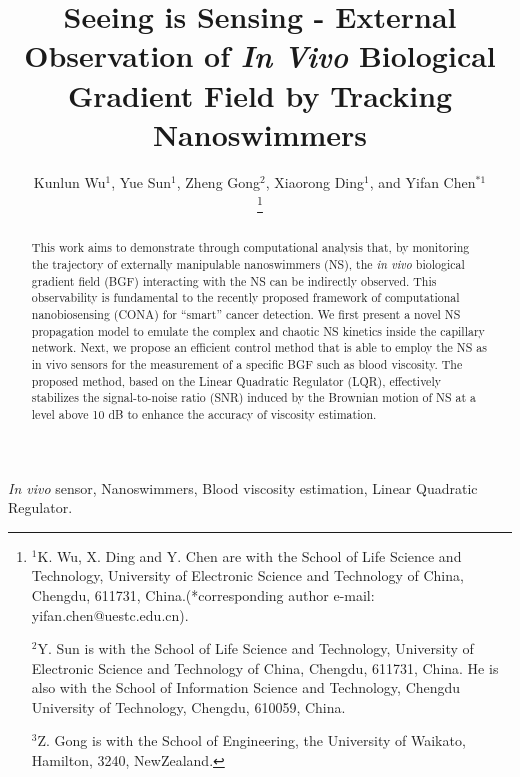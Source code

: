 \documentclass[conference]{IEEEtran}
\begin{document}

\title{Seeing is Sensing - External Observation of \emph{In Vivo} Biological Gradient Field by Tracking Nanoswimmers  }


\author{Kunlun Wu$^{1}$, %
	  Yue Sun$^{1}$,
	  Zheng Gong$^{2}$,
	  Xiaorong Ding$^{1}$, and
	  Yifan Chen$^{*1}$

\thanks{$^{1}$K. Wu, X. Ding and Y. Chen are with the School of Life Science and Technology, University of Electronic Science and Technology of China, Chengdu, 611731, China.(*corresponding author e-mail: yifan.chen@uestc.edu.cn).

	  $^{2}$Y. Sun is with the School of Life Science and Technology, University of Electronic Science and Technology of China, Chengdu, 611731, China. He is also with the School of Information Science and Technology, Chengdu University of Technology, Chengdu, 610059, China.

	  $^{3}$Z. Gong is with the School of  Engineering, the University of Waikato, Hamilton, 3240, NewZealand.
      }%

}



\maketitle

\begin{abstract}
This work aims to demonstrate through computational analysis that, by monitoring the trajectory of externally manipulable nanoswimmers (NS), the \emph{in vivo} biological gradient field (BGF) interacting with the NS can be indirectly observed. This observability is fundamental to the recently proposed framework of computational nanobiosensing (CONA) for “smart” cancer detection. We first present a novel NS propagation model to emulate the complex and chaotic NS kinetics inside the capillary network. Next, we propose an efficient control method that is able to employ the NS as in vivo sensors for the measurement of a specific BGF such as blood viscosity. The proposed method, based on the Linear Quadratic Regulator (LQR), effectively stabilizes the signal-to-noise ratio (SNR) induced by the Brownian motion of NS at a level above 10 dB to enhance the accuracy of viscosity estimation.
\end{abstract}

\begin{IEEEkeywords}
\emph{In vivo} sensor, Nanoswimmers, Blood viscosity estimation, Linear Quadratic Regulator.
\end{IEEEkeywords}
\end{document}
